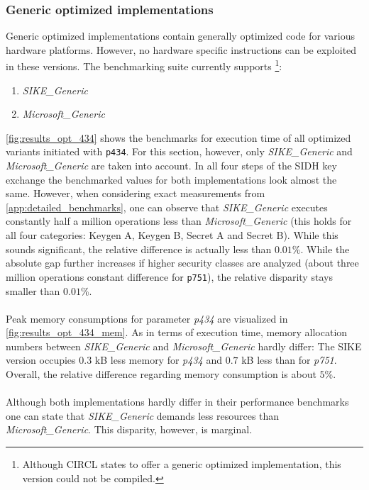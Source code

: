 \subsubsection{Generic optimized implementations}\label{sec:analysis_generic}
Generic optimized implementations contain generally optimized code for various hardware platforms. However, no hardware specific instructions can be exploited in these versions. The benchmarking suite currently supports \footnote{Although CIRCL states to offer a generic optimized implementation\parencite{circl2020github}, this version could not be compiled.}:
\begin{enumerate}
\item \textit{SIKE\_Generic}
\item \textit{Microsoft\_Generic}
\end{enumerate}
\autoref{fig:results_opt_434} shows the benchmarks for execution time of all optimized variants initiated with \texttt{p434}. For this section, however, only \textit{SIKE\_Generic} and \textit{Microsoft\_Generic} are taken into account. In all four steps of the SIDH key exchange the benchmarked values for both implementations look almost the same. However, when considering exact measurements from  \ref{app:detailed_benchmarks}, one can observe that \textit{SIKE\_Generic} executes constantly half a million operations less than \textit{Microsoft\_Generic} (this holds for all four categories: Keygen A, Keygen B, Secret A and Secret B). While this sounds significant, the relative difference is actually less than $0.01$\%. While the absolute gap further increases if higher security classes are analyzed (about three million operations constant difference for \texttt{p751}), the relative disparity stays smaller than $0.01$\%.
\\\\
Peak memory consumptions for parameter \textit{p434} are visualized in  \autoref{fig:results_opt_434_mem}. As in terms of execution time, memory allocation numbers between \textit{SIKE\_Generic} and \textit{Microsoft\_Generic} hardly differ: The SIKE version occupies $0.3$ kB less memory for \textit{p434} and $0.7$ kB less than for \textit{p751}. Overall, the relative difference regarding memory consumption is about $5$\%.
\\\\
Although both implementations hardly differ in their performance benchmarks one can state that \textit{SIKE\_Generic} demands less resources than \textit{Microsoft\_Generic}. This disparity, however, is marginal.

